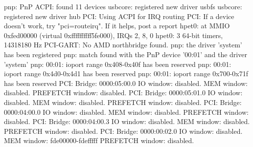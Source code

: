 \documentclass[mingoth,a4paper]{jsarticle}
\begin{document}
\begin{commandline}
pnp: PnP ACPI: found 11 devices
usbcore: registered new driver usbfs
usbcore: registered new driver hub
PCI: Using ACPI for IRQ routing
PCI: If a device doesn't work, try "pci=routeirq".  If it helps, post a report
hpet0: at MMIO 0xfed00000 (virtual 0xffffffffff5fe000), IRQs 2, 8, 0
hpet0: 3 64-bit timers, 14318180 Hz
PCI-GART: No AMD northbridge found.
pnp: the driver 'system' has been registered
pnp: match found with the PnP device '00:01' and the driver 'system'
pnp: 00:01: ioport range 0x408-0x40f has been reserved
pnp: 00:01: ioport range 0x4d0-0x4d1 has been reserved
pnp: 00:01: ioport range 0x700-0x71f has been reserved
PCI: Bridge: 0000:05:00.0
  IO window: disabled.
  MEM window: disabled.
  PREFETCH window: disabled.
PCI: Bridge: 0000:05:01.0
  IO window: disabled.
  MEM window: disabled.
  PREFETCH window: disabled.
PCI: Bridge: 0000:04:00.0
  IO window: disabled.
  MEM window: disabled.
  PREFETCH window: disabled.
PCI: Bridge: 0000:04:00.3
  IO window: disabled.
  MEM window: disabled.
  PREFETCH window: disabled.
PCI: Bridge: 0000:00:02.0
  IO window: disabled.
  MEM window: fde00000-fdefffff
  PREFETCH window: disabled.
\end{commandline}
\end{document}
